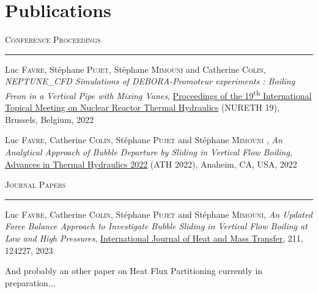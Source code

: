 

\chapter*{Publications} %

\npar
\npar


\textsc{Conference Proceedings}
\npar

\hrule

\npar
\npar

Luc \textsc{Favre}, Stéphane \textsc{Pujet}, Stéphane \textsc{Mimouni} and Catherine \textsc{Colin}, \textit{NEPTUNE\_CFD Simulations of DEBORA-Promoteur experiments : Boiling Freon in a Vertical Pipe with Mixing Vanes}, \ul{Proceedings of the 19\textsuperscript{th} International Topical Meeting on Nuclear Reactor Thermal Hydraulics} (NURETH 19), Brussels, Belgium, 2022

\npar
\npar

Luc \textsc{Favre}, Catherine \textsc{Colin}, Stéphane \textsc{Pujet} and Stéphane \textsc{Mimouni} , \textit{An Analytical Approach of Bubble Departure by Sliding in Vertical Flow Boiling}, \ul{Advances in Thermal Hydraulics 2022} (ATH 2022), Anaheim, CA, USA, 2022


\npar
\npar
\npar
\npar
\npar

\textsc{Journal Papers}
\npar

\hrule

\npar
\npar

Luc \textsc{Favre}, Catherine \textsc{Colin}, Stéphane \textsc{Pujet} and Stéphane \textsc{Mimouni}, \textit{An Updated Force Balance Approach to Investigate Bubble Sliding in Vertical Flow Boiling at Low and High Pressures}, \ul{International Journal of Heat and Mass Transfer}, 211, 124227, 2023

\npar
\npar

And probably an other paper on Heat Flux Partitioning currently in preparation... {\Large{ \smiley{} }}